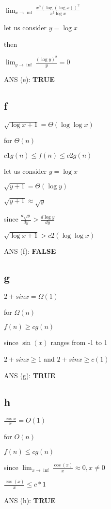 \documentclass[
]{article}
\begin{document}
\(\lim_{x \to \inf} \frac{x^3(\log(\log{x}))^2}{x^3 \log{x}}\)

let us consider \(y = \log{x}\)

then

\(\lim_{y \to \inf} \frac{(\log{y})^2}{y} = 0\)

ANS (e): \textbf{TRUE}

\hypertarget{f}{%
\subsection{f}\label{f}}

\(\sqrt{\log{x}+1} = \Theta{(\log\log{x})}\)

for \(\Theta{(n)}\)

\(c1g(n)\le f(n) \le c2g(n)\)

let us consider \(y = \log{x}\)

\(\sqrt{y+1} = \Theta{(\log{y})}\)

\(\sqrt{y+1} \approx \sqrt{y}\)

since \(\frac{d\sqrt{y}}{dy} > \frac{d\log{y}}{dy}\)

\(\sqrt{\log{x}+1} > c2(\log\log{x})\)

ANS (f): \textbf{FALSE}

\hypertarget{g}{%
\subsection{g}\label{g}}

\(2+sin{x} = \Omega{(1)}\)

for \(\Omega{(n)}\)

\(f(n) \ge c g(n)\)

since \(\sin(x)\) ranges from -1 to 1

\(2+sin{x} \ge 1\) and \(2+sin{x} \ge c(1)\)

ANS (g): \textbf{TRUE}

\hypertarget{h}{%
\subsection{h}\label{h}}

\(\frac{\cos{x}}{x} = O{(1)}\)

for \(O{(n)}\)

\(f(n) \le c g(n)\)

since \(\lim_{x \to \inf} \frac{\cos(x)}{x} \approx 0, x\ne0\)

\(\frac{\cos(x)}{x} \le c * 1\)

ANS (h): \textbf{TRUE}
\end{document}

